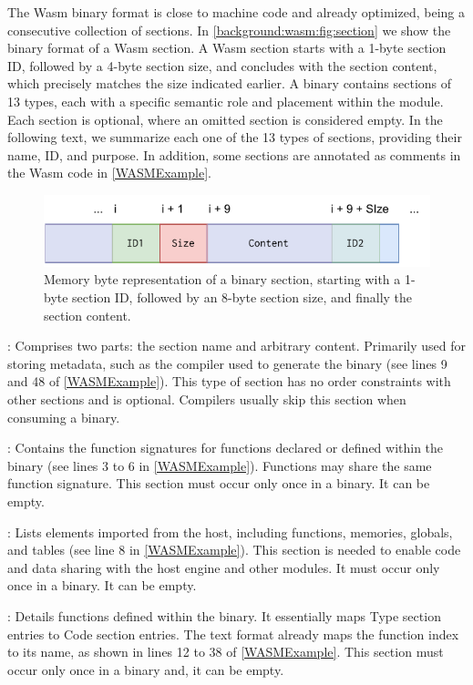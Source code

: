 The Wasm binary format is close to machine code and already optimized, being a consecutive collection of sections.
In \autoref{background:wasm:fig:section} we show the binary format of a Wasm section.
A Wasm section starts with a 1-byte section ID, followed by a 4-byte section size, and concludes with the section content, which precisely matches the size indicated earlier.
A \wasm binary contains sections of 13 types, each with a specific semantic role and placement within the module. 
Each section is optional, where an omitted section is considered empty.
In the following text, we summarize each one of the 13 types of \wasm sections, providing their name, ID, and purpose. 
In addition, some sections are annotated as comments in the Wasm code in \autoref{WASMExample}.
    
\begin{figure}[h]
    \centering
    \includegraphics[width=0.5\linewidth]{figures/section.pdf}
    \caption{Memory byte representation of a \Wasm binary section, starting with a 1-byte section ID, followed by an 8-byte section size, and finally the section content.}
    \label{background:wasm:fig:section}
\end{figure}

: Comprises two parts: the section name and arbitrary content. Primarily used for storing metadata, such as the compiler used to generate the binary (see lines 9 and 48 of \autoref{WASMExample}). This type of section has no order constraints with other sections and is optional. Compilers usually skip this section when consuming a \Wasm binary. 

: Contains the function signatures for functions declared or defined within the binary (see lines 3 to 6 in \autoref{WASMExample}). Functions may share the same function signature. This section must occur only once in a binary. It can be empty. 

: Lists elements imported from the host, including functions, memories, globals, and tables (see line 8 in \autoref{WASMExample}). This section is needed to enable code and data sharing with the host engine and other modules. It must occur only once in a binary. It can be empty.

: Details functions defined within the binary. It essentially maps Type section entries to Code section entries. The text format already maps the function index to its name, as shown in lines 12 to 38 of \autoref{WASMExample}. This section must occur only once in a binary and, it can be empty. 

